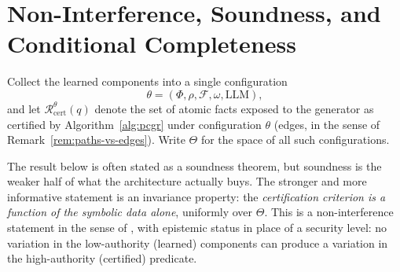 \documentclass[11pt]{article}
\newcommand{\F}{\mathcal{F}}
\begin{document}
\section{Non-Interference, Soundness, and Conditional Completeness}
\label{sec:noninterference}

Collect the learned components into a single configuration
\[
\theta=(\Phi,\rho,\F,\omega,\text{LLM}),
\]
and let $\mathcal{R}^{\theta}_{\mathrm{cert}}(q)$ denote the set of atomic facts exposed to the generator as certified by Algorithm~\ref{alg:pcgr} under configuration $\theta$ (edges, in the sense of Remark~\ref{rem:paths-vs-edges}). Write $\Theta$ for the space of all such configurations.

The result below is often stated as a soundness theorem, but soundness is the weaker half of what the architecture actually buys. The stronger and more informative statement is an invariance property: the \emph{certification criterion is a function of the symbolic data alone}, uniformly over $\Theta$. This is a non-interference statement in the sense of \citet{goguen1982}, with epistemic status in place of a security level: no variation in the low-authority (learned) components can produce a variation in the high-authority (certified) predicate.
\end{document}
